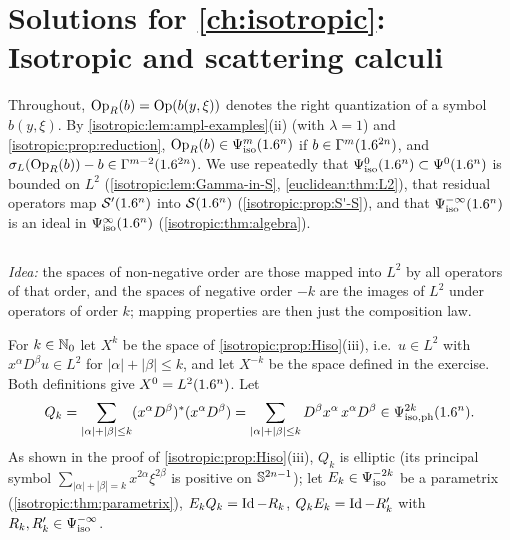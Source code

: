 \providecommand{\Gs}[1]{\Gamma^{#1}}
\providecommand{\Gph}[1]{\Gamma^{#1}_{\mathrm{ph}}}
\providecommand{\Psiisoph}[1]{\Psi^{#1}_{\mathrm{iso,ph}}}
\providecommand{\Hiso}[1]{H^{#1}_{\mathrm{iso}}}
\providecommand{\OpW}{\operatorname{Op}^{\mathrm{W}}}

\section{Solutions for \cref{ch:isotropic}: Isotropic and scattering calculi}\label{solutions:isotropic}

Throughout, $\operatorname{Op}_R(b)=\operatorname{Op}(b(y,\xi))$ denotes the right quantization of a
symbol $b(y,\xi)$. By \cref{isotropic:lem:ampl-examples}(ii) (with $\lambda=1$)
and \cref{isotropic:prop:reduction}, $\operatorname{Op}_R(b)\in\Psi^{m}_{\mathrm{iso}}(1.6^n)$ if
$b\in\Gs{m}(\R^{2n})$, and $\sigma_L(\Op_R(b))-b\in\Gs{m-2}(\R^{2n})$. We use
repeatedly that $\Psi^{0}_{\mathrm{iso}}(1.6^n)\subset\Psi^{0}(1.6^n)$ is bounded on $L^2$
(\cref{isotropic:lem:Gamma-in-S}, \cref{euclidean:thm:L2}), that residual
operators map $\mathcal{S}'(1.6^n)$ into $\mathcal{S}(1.6^n)$ (\cref{isotropic:prop:S'-S}), and
that $\Psi^{-\infty}_{\mathrm{iso}}(1.6^n)$ is an ideal in $\Psi^{\infty}_{\mathrm{iso}}(1.6^n)$
(\cref{isotropic:thm:algebra}).

\subsection*{}

\emph{Idea:} the spaces of non-negative order are those mapped into $L^2$ by
all operators of that order, and the spaces of negative order $-k$ are the
images of $L^2$ under operators of order $k$; mapping properties are then just
the composition law.

For $k\in\mathbb{N}_0$ let $X^k$ be the space of \cref{isotropic:prop:Hiso}(iii), i.e.\
$u\in L^2$ with $x^\alpha D^\beta u\in L^2$ for $|\alpha|+|\beta|\le k$, and let
$X^{-k}$ be the space defined in the exercise. Both definitions give
$X^0=L^2(1.6^n)$. Let
\begin{equation*}
  Q_k=\sum_{|\alpha|+|\beta|\le k}(x^\alpha D^\beta)^*(x^\alpha D^\beta)
  =\sum_{|\alpha|+|\beta|\le k}D^\beta x^\alpha\,x^\alpha D^\beta\in\Psiisoph{2k}(\R^n).
\end{equation*}
As shown in the proof of \cref{isotropic:prop:Hiso}(iii), $Q_k$ is elliptic
(its principal symbol $\sum_{|\alpha|+|\beta|=k}x^{2\alpha}\xi^{2\beta}$ is
positive on $\mathbb{S}^{2n-1}$); let $E_k\in\Psi^{-2k}_{\mathrm{iso}}$ be a parametrix
(\cref{isotropic:thm:parametrix}), $E_kQ_k=\operatorname{Id}-R_k$, $Q_kE_k=\operatorname{Id}-R_k'$ with
$R_k,R_k'\in\Psi^{-\infty}_{\mathrm{iso}}$.

